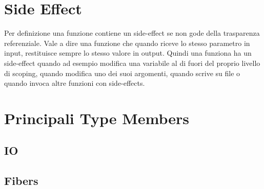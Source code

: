\section{Side Effect}
Per definizione una funzione contiene un side-effect se non gode della trasparenza referenziale. Vale a dire una funzione che quando riceve lo stesso parametro in input, restituisce sempre lo stesso valore in output. Quindi una funziona ha un side-effect quando ad esempio modifica una variabile al di fuori del proprio livello di scoping, quando modifica uno dei suoi argomenti, quando scrive su file o quando invoca altre funzioni con side-effects.

\section{Principali Type Members}

\subsection{IO}

\subsection{Fibers}